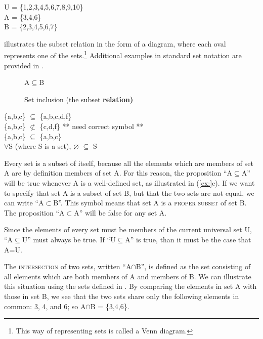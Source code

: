 \ea
U = \{1,2,3,4,5,6,7,8,9,10\}\\
A = \{3,4,6\}\\
B = \{2,3,4,5,6,7\}
\z


 illustrates the subset relation in the form of a diagram, where each oval represents one of the sets.\footnote{This way of representing sets is called a Venn diagram.} Additional examples in standard set notation are provided in .


\begin{figure}

  \textsf{A}\textbf{${\subseteq}$}\textsf{B}\\

\caption{\label{fig:key:1} Set inclusion (the subset \textbf{relation)}}
\end{figure}

\ea
\ea \{a,b,c\} ${\subseteq}$ \{a,b,c,d,f\}\\
\ex \{a,b,c\} ${\not\subset}$ \{c,d,f\}  ** need correct symbol **\\
\ex \{a,b,c\} ${\subseteq}$ \{a,b,c\}\\
\ex ${\forall}$S (where S is a set), ⌀ ${\subseteq}$ S
                       \z
\z


Every set is a subset of itself, because all the elements which are members of set A are by definition members of set A. For this reason, the proposition “A${\subseteq}$A” will be true whenever A is a well-defined set, as illustrated in (\ref{ex:}c). If we want to specify that set A is a subset of set B, but that the two sets are not equal, we can write “A${\subset}$B”. This symbol means that set A is a \textsc{proper subset} of set B. The proposition “A${\subset}$A” will be false for any set A.



Since the elements of every set must be members of the current universal set U, “A${\subseteq}$U” must always be true. If “U${\subseteq}$A” is true, than it must be the case that A=U.



The \textsc{intersection} of two sets, written “A${\cap}$B”, is defined as the set consisting of all elements which are both members of A and members of B. We can illustrate this situation using the sets defined in . By comparing the elements in set A with those in set B, we see that the two sets share only the following elements in common: 3, 4, and 6; so A${\cap}$B = \{3,4,6\}.


